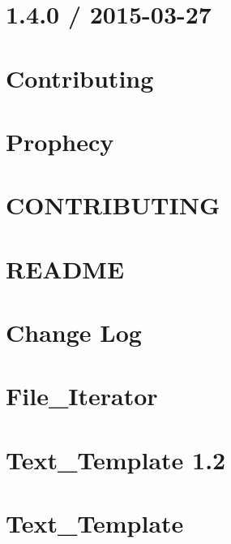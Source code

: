 \documentclass[twoside]{book}
\newcommand{\+}{\discretionary{\mbox{\scriptsize$\hookleftarrow$}}{}{}}
\begin{document}
\chapter{1.4.0 / 2015-\/03-\/27}
\label{md_vendor_phpspec_prophecy__c_h_a_n_g_e_s}

\chapter{Contributing}
\label{md_vendor_phpspec_prophecy__c_o_n_t_r_i_b_u_t_i_n_g}

\chapter{Prophecy}
\label{md_vendor_phpspec_prophecy__r_e_a_d_m_e}

\chapter{C\+O\+N\+T\+R\+I\+B\+U\+T\+I\+N\+G}
\label{md_vendor_phpunit_php-code-coverage__c_o_n_t_r_i_b_u_t_i_n_g}

\chapter{R\+E\+A\+D\+M\+E}
\label{md_vendor_phpunit_php-code-coverage__r_e_a_d_m_e}

\chapter{Change Log}
\label{md_vendor_phpunit_php-file-iterator__change_log}

\chapter{File\+\_\+\+Iterator}
\label{md_vendor_phpunit_php-file-iterator__r_e_a_d_m_e}

\chapter{Text\+\_\+\+Template 1.2}
\label{md_vendor_phpunit_php-text-template__change_log}

\chapter{Text\+\_\+\+Template}
\label{md_vendor_phpunit_php-text-template__r_e_a_d_m_e}

\end{document}
